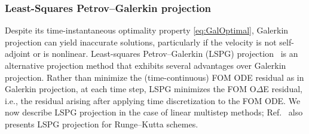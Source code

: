\documentclass[3p,computermodern,10pt]{elsarticle}
\begin{document}
\subsubsection{Least-Squares Petrov--Galerkin projection}
Despite its time-instantaneous optimality property 
\eqref{eq:GalOptimal}, Galerkin projection can yield inaccurate solutions,
particularly if the velocity is not self-adjoint or
is nonlinear. 
Least-squares Petrov--Galerkin (LSPG)
projection~\cite{carlberg_lspg_v_galerkin,carlberg_thesis,carlberg_gnat,bui_unsteady,bui_thesis}
is an alternative projection method that exhibits several advantages over Galerkin
projection.
Rather than minimize the (time-continuous) FOM ODE residual as in Galerkin
projection, at each time step, LSPG minimizes
the FOM O$\Delta$E residual, i.e., the residual arising after applying time discretization to the FOM ODE.  
We now describe LSPG projection in the case of linear multistep methods;
Ref.~\cite{carlberg_lspg_v_galerkin} also presents LSPG projection for Runge--Kutta
schemes. 
\end{document}
